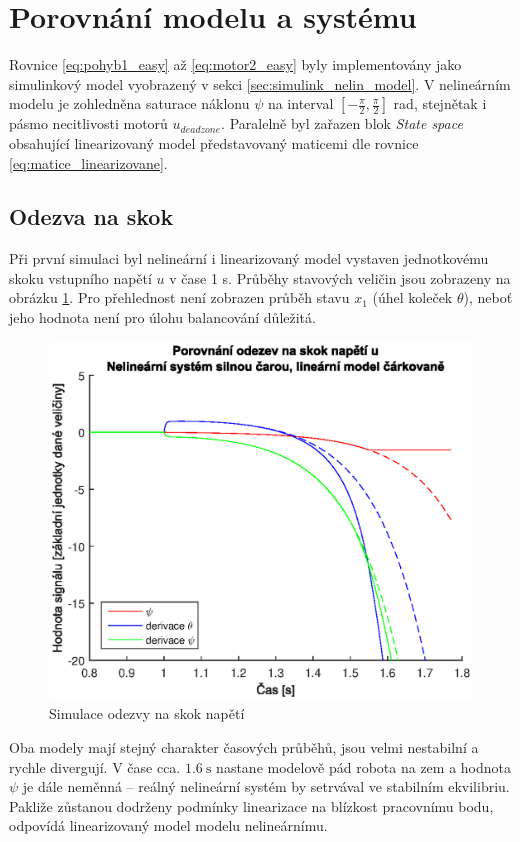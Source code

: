 \documentclass[conference]{IEEEtran}
\begin{document}
\section{Porovnání modelu a systému}

Rovnice \eqref{eq:pohyb1_easy} až \eqref{eq:motor2_easy} byly implementovány jako simulinkový model vyobrazený v sekci \ref{sec:simulink_nelin_model}.
V nelineárním modelu je zohledněna saturace náklonu $\psi$ na interval $[-\frac{\pi}{2}, \frac{\pi}{2}]$ rad, stejnětak i pásmo necitlivosti motorů $u_{deadzone}$.
Paralelně byl zařazen blok \textit{State space} obsahující linearizovaný model představovaný maticemi dle rovnice \eqref{eq:matice_linearizovane}.
\subsection{Odezva na skok}
Při první simulaci byl nelineární i linearizovaný model
vystaven jednotkovému skoku vstupního napětí $u$ v čase 1 \si{\second}. Průběhy stavových veličin jsou zobrazeny na obrázku \ref{fig:porovnani_skok}.
Pro přehlednost není zobrazen průběh stavu $x_1$ (úhel koleček $\theta$), neboť jeho hodnota není pro úlohu balancování důležitá.
\begin{figure}[htbp]
    \centerline{\includegraphics[width=\linewidth]{porovnani_skok.eps}}
    \caption{Simulace odezvy na skok napětí}
    \label{fig:porovnani_skok}        
\end{figure}
Oba modely mají stejný charakter časových průběhů, jsou velmi nestabilní a rychle divergují.
V čase cca. $1.6~\si{\second}$ nastane modelově pád robota na zem a hodnota $\psi$ je dále neměnná -- reálný nelineární systém by setrvával ve stabilním ekvilibriu.
Pakliže zůstanou dodrženy podmínky linearizace na blízkost pracovnímu bodu, odpovídá linearizovaný model modelu nelineárnímu.
\end{document}
